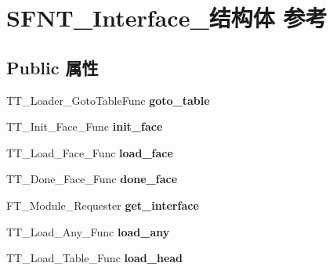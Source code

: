\hypertarget{struct_s_f_n_t___interface__}{}\section{S\+F\+N\+T\+\_\+\+Interface\+\_\+结构体 参考}
\label{struct_s_f_n_t___interface__}
\subsection*{Public 属性}
\begin{DoxyCompactItemize}
\item 
\mbox{\label{struct_s_f_n_t___interface___aee5cacbd128dd48ddf73ab6eb8d89500}} 
T\+T\+\_\+\+Loader\+\_\+\+Goto\+Table\+Func {\bfseries goto\+\_\+table}
\item 
\mbox{\label{struct_s_f_n_t___interface___a9ec559df25a7bd65db0c1c4df8554321}} 
T\+T\+\_\+\+Init\+\_\+\+Face\+\_\+\+Func {\bfseries init\+\_\+face}
\item 
\mbox{\label{struct_s_f_n_t___interface___ad87a982ddabe05f0d15330aec54f7597}} 
T\+T\+\_\+\+Load\+\_\+\+Face\+\_\+\+Func {\bfseries load\+\_\+face}
\item 
\mbox{\label{struct_s_f_n_t___interface___a4066721e7bb91b28819b5e673fa406bb}} 
T\+T\+\_\+\+Done\+\_\+\+Face\+\_\+\+Func {\bfseries done\+\_\+face}
\item 
\mbox{\label{struct_s_f_n_t___interface___a417552cced1058aeba30fd485fd838e2}} 
F\+T\+\_\+\+Module\+\_\+\+Requester {\bfseries get\+\_\+interface}
\item 
\mbox{\label{struct_s_f_n_t___interface___a9497a7c23efc4a27124b72f794167f33}} 
T\+T\+\_\+\+Load\+\_\+\+Any\+\_\+\+Func {\bfseries load\+\_\+any}
\item 
\mbox{\label{struct_s_f_n_t___interface___af4e699f29f305ac50a3e35abda888936}} 
T\+T\+\_\+\+Load\+\_\+\+Table\+\_\+\+Func {\bfseries load\+\_\+head}
\item 
\mbox{\label{struct_s_f_n_t___interface___a8e24e72f3a69f8c4415a1f9e433da08f}} 

\end{DoxyCompactItemize}

